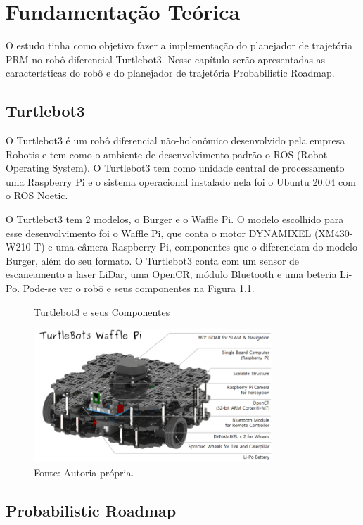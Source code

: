 \chapter{Fundamentação Teórica}
\label{chap:fundteor}

O estudo tinha como objetivo fazer a implementação do planejador de trajetória PRM no robô diferencial Turtlebot3. Nesse capítulo serão apresentadas as características do robô e do planejador de trajetória Probabilistic Roadmap.

\section{Turtlebot3}
O Turtlebot3 é um robô diferencial não-holonômico desenvolvido pela empresa Robotis e tem como o ambiente de desenvolvimento padrão o ROS (Robot Operating System). O Turtlebot3 tem como unidade central de processamento uma Raspberry Pi e o sistema operacional instalado nela foi o Ubuntu 20.04 com o ROS Noetic. 

O Turtlebot3 tem 2 modelos, o Burger e o Waffle Pi. O modelo escolhido para esse desenvolvimento foi o Waffle Pi, que conta o motor DYNAMIXEL (XM430-W210-T) e uma câmera Raspberry Pi, componentes que o diferenciam do modelo Burger, além do seu formato. O Turtlebot3 conta com um sensor de escaneamento a laser LiDar, uma OpenCR, módulo Bluetooth e uma beteria Li-Po. Pode-se ver o robô e seus componentes na Figura \ref{fig:turt2}.

\begin{figure} [h!]	
   \centering
   \caption{Turtlebot3 e seus Componentes}
   \includegraphics[width=0.8\textwidth]{Figures/turtlebot3_waffle_pi_components.png}
   \caption*{Fonte: Autoria própria.}
   \label{fig:turt2}
\end{figure}

\section{Probabilistic Roadmap}

